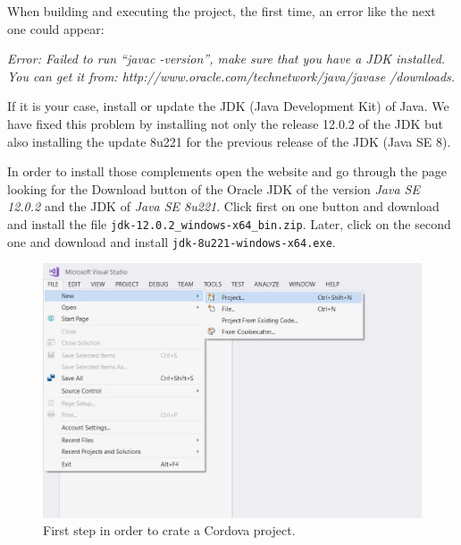 \begin{IN}
    When building and executing the project, the first time, an error like the next one could appear:\newline
    
    \textit{Error: Failed to run ``javac -version'', make sure that you have a JDK installed.} \newline
    \textit{You can get it from: http://www.oracle.com/technetwork/java/javase /downloads.} \newline 
    
    If it is your case, install or update the JDK (Java Development Kit) of Java. We have fixed this problem by installing not only the release 12.0.2 of the JDK but also installing the update 8u221 for the previous release of the JDK (Java SE 8). \newline
    
    In order to install those complements open the website and go through the page looking for the Download button of the Oracle JDK of the version \textit{Java SE 12.0.2} and the JDK of \textit{Java SE 8u221}. Click first on one button and download and install the file \texttt{jdk-12.0.2\_windows-x64\_bin.zip}. Later, click on the second one and download and install \texttt{jdk-8u221-windows-x64.exe}.
\end{IN}

\begin{figure}
    \centering
    \includegraphics[width=0.9 \textwidth]{Figures/Cordova1}
    \caption{First step in order to crate a Cordova project.}
    \label{fig:Cordova1}
\end{figure}

